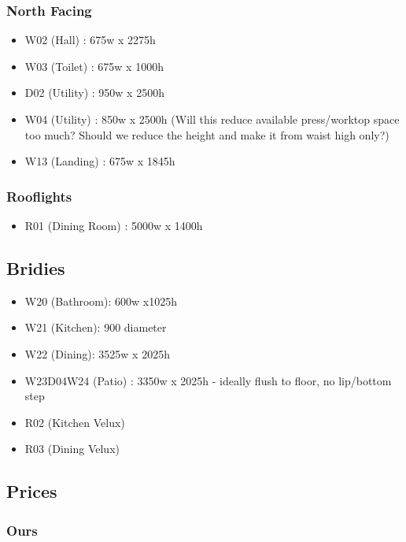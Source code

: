 \subsubsection{North Facing}
\begin{itemize}
\item W02 (Hall) : 675w x 2275h
\item W03 (Toilet) : 675w x 1000h 
\item D02 (Utility) : 950w x 2500h
\item W04 (Utility) : 850w x 2500h (Will this reduce available press/worktop space too much? 
        Should we reduce the height and make it from waist high only?)
\item W13 (Landing) : 675w x 1845h
\end{itemize}

\subsubsection{Rooflights}
\begin{itemize}
\item R01 (Dining Room) : 5000w x 1400h
\end{itemize}    

\subsection {Bridies}
\begin{itemize}
\item W20 (Bathroom): 600w x1025h
\item W21 (Kitchen): 900 diameter
\item W22 (Dining): 3525w x 2025h
\item W23D04W24 (Patio) : 3350w x 2025h - ideally flush to floor, no lip/bottom step
\item R02 (Kitchen Velux)
\item R03 (Dining Velux)
\end{itemize}

\subsection{Prices}
\subsubsection{Ours}

